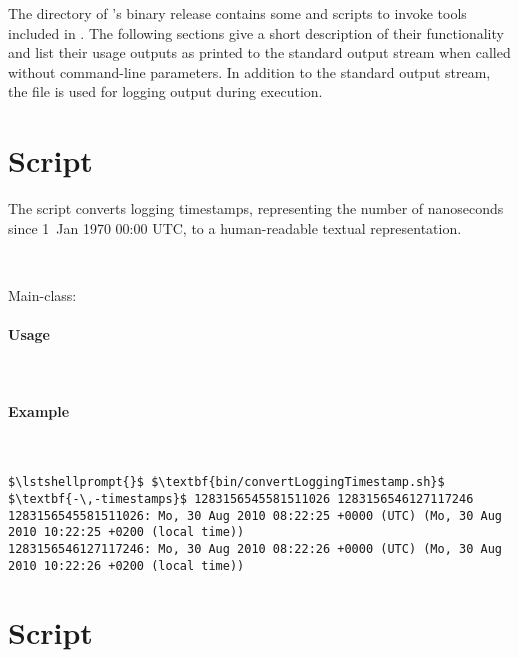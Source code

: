 The  directory of \Kieker's binary release contains some   and %
 scripts to invoke tools included in \file{\mainJar{}}. %
The following sections give a short description of their functionality and %
list their usage outputs as printed to the standard output stream when %
called without command-line parameters. %
In addition to the standard output stream, the file  %
is used for logging output during execution.


\section{Script }

The script converts \KiekerMonitoringPart{} logging timestamps, %
representing the number of nanoseconds since 1~Jan 1970 00:00 UTC, to a %
human-readable textual representation. %

\

\noindent Main-class: {\small {}}

\paragraph*{Usage}\

\setTextListing


\paragraph*{Example}\

\setTextListing
\begin{lstlisting}
$\lstshellprompt{}$ $\textbf{bin/convertLoggingTimestamp.sh}$ $\textbf{-\,-timestamps}$ 1283156545581511026 1283156546127117246 
1283156545581511026: Mo, 30 Aug 2010 08:22:25 +0000 (UTC) (Mo, 30 Aug 2010 10:22:25 +0200 (local time))
1283156546127117246: Mo, 30 Aug 2010 08:22:26 +0000 (UTC) (Mo, 30 Aug 2010 10:22:26 +0200 (local time))
\end{lstlisting}

\section{Script }

